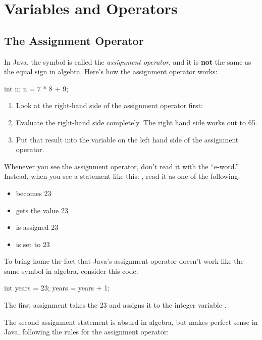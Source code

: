 \chapter{Variables and Operators}
\label{variables}
\section{The Assignment Operator}
In Java, the symbol \java{=} is called the {\em assignment operator}, and it is {\bf not} the same as the equal sign in algebra.
Here's how the assignment operator works:

\begin{code}
int n;
n = 7 * 8 + 9;
\end{code}

\begin{enumerate}
\item Look at the right-hand side of the assignment operator first: 
\item Evaluate the right-hand side completely. The right hand side works out to 65.
\item Put that result into the variable on the left hand side of the assignment operator.
\end{enumerate}

Whenever you see the assignment operator, don't read it with the ``e-word.'' Instead, when you see a statement like this:
, read it as one of the following:

\begin{itemize}
\item {} becomes 23
\item {} gets the value 23
\item {} is assigned 23
\item {} is set to 23
\end{itemize}

To bring home the fact that Java's assignment operator \java{=} doesn't work like the same symbol in algebra, consider this code:

\begin{code}
int years = 23;
years = years + 1;
\end{code}

The first assignment takes the 23 and assigns it to the integer variable .

The second assignment statement is absurd in algebra, but makes perfect sense in Java, following the rules for the assignment operator:

